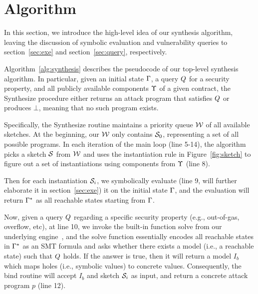 \section{Algorithm}\label{sec:algo}
In this section, we introduce the high-level idea of our synthesis algorithm, 
leaving the discussion of symbolic evaluation and vulnerability queries
 to section~\ref{sec:exe} and section~\ref{sec:query}, respectively.

Algorithm~\ref{alg:synthesis} describes the pseudocode of our top-level 
synthesis algorithm. In particular, given an initial state $\Gamma$, 
a query $Q$ for a security property, and all publicly available 
components $\Upsilon$ of a given contract, the {\sc Synthesize} procedure 
either returns an attack program that satisfies $Q$ or produces 
$\bot$, meaning that no such program exists.

Specifically, the {\sc Synthesize} routine maintains a priority queue 
$\mathcal{W}$ of all available sketches. At the beginning, our $\mathcal{W}$
only contains $\mathcal{S}_0$, representing a set of all possible programs.
In each iteration of the main loop (line 5-14), the algorithm picks a
sketch $\mathcal{S}$ from $\mathcal{W}$ and uses the {\sc instantiation} rule
in Figure~\ref{fig:sketch} to figure out a set of instantiations using 
components from $\Upsilon$ (line 8). 

Then for each instantiation $\mathcal{S}_i$, we symbolically evaluate (line 9, 
will further elaborate it in section~\ref{sec:exe}) it on the initial 
state $\Gamma$, and the evaluation will return $\Gamma^{*}$ as all reachable
states starting from $\Gamma$. 

Now, given a query $Q$ regarding a specific security property (e.g., out-of-gas, overflow, etc), 
at line 10, we invoke the built-in function {\sc solve} from our underlying engine~\cite{rosette}, and 
the {\sc solve} function essentially encodes all reachable states in $\Gamma^{*}$ as an 
SMT formula and asks whether there exists a model (i.e., a reachable state) such that 
$Q$ holds. If the answer is {\sc true}, then it will return a model $I_b$ which maps 
holes (i.e., symbolic values) to concrete values. Consequently, the {\sc bind} routine will accept $I_b$ and sketch $\mathcal{S}_i$ as input, and return a concrete attack program $p$ (line 12).  


